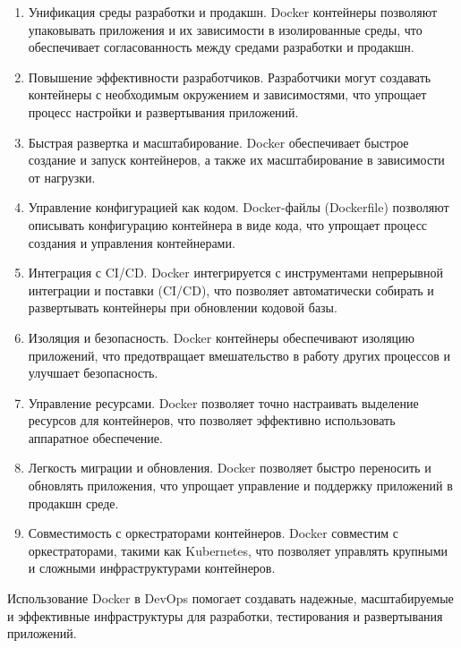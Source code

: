 \documentclass[referat]{SCWorks}
\begin{document}
\begin{enumerate}
\item Унификация среды разработки и продакшн. Docker контейнеры позволяют упаковывать приложения и их зависимости в изолированные среды, что обеспечивает согласованность между средами разработки и продакшн.

\item Повышение эффективности разработчиков. Разработчики могут создавать контейнеры с необходимым окружением и зависимостями, что упрощает процесс настройки и развертывания приложений.

\item Быстрая развертка и масштабирование. Docker обеспечивает быстрое создание и запуск контейнеров, а также их масштабирование в зависимости от нагрузки.

\item Управление конфигурацией как кодом. Docker-файлы (Dockerfile) позволяют описывать конфигурацию контейнера в виде кода, что упрощает процесс создания и управления контейнерами.

\item Интеграция с CI/CD. Docker интегрируется с инструментами непрерывной интеграции и поставки (CI/CD), что позволяет автоматически собирать и развертывать контейнеры при обновлении кодовой базы.

\item Изоляция и безопасность. Docker контейнеры обеспечивают изоляцию приложений, что предотвращает вмешательство в работу других процессов и улучшает безопасность.

\item Управление ресурсами. Docker позволяет точно настраивать выделение ресурсов для контейнеров, что позволяет эффективно использовать аппаратное обеспечение.

\item Легкость миграции и обновления. Docker позволяет быстро переносить и обновлять приложения, что упрощает управление и поддержку приложений в продакшн среде.

\item Совместимость с оркестраторами контейнеров. Docker совместим с оркестраторами, такими как Kubernetes, что позволяет управлять крупными и сложными инфраструктурами контейнеров.
\end{enumerate}

Использование Docker в DevOps помогает создавать надежные, масштабируемые и эффективные инфраструктуры для разработки, тестирования и развертывания приложений.
\end{document}
